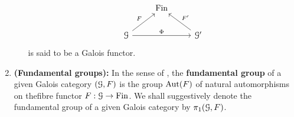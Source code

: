 \begin{definition}
\begin{enumerate}
\begin{itemize}
                            $$
                                \begin{tikzcd}
                                	& \Fin \\
                                	\calG && {\calG'}
                                	\arrow["F", from=2-1, to=1-2]
                                	\arrow["{F'}"', from=2-3, to=1-2]
                                	\arrow["\Phi", from=2-1, to=2-3]
                                \end{tikzcd}
                            $$
                        is said to be a Galois functor.
                    \end{itemize}
                \item \textbf{(Fundamental groups):} In the sense of \cite[Theorem 2.16]{noohi_fundamental_group}, the \textbf{fundamental group} of a given Galois category $(\mathcal{G}, F)$ is the group $\mathrm{Aut}(F)$ of natural automorphisms on thefibre functor $F: \mathcal{G} \to \mathrm{Fin}$. We shall suggestively denote the fundamental group of a given Galois category by $\pi_1(\mathcal{G}, F)$. 
            \end{enumerate}
        \end{definition}
        

